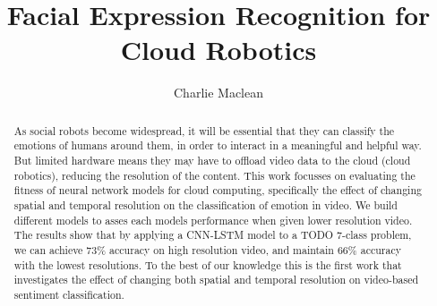 \documentclass[sigconf]{acmart}
\begin{document}
\title{Facial Expression Recognition for Cloud Robotics}

\author{Charlie Maclean}


\renewcommand{\shortauthors}{Charlie Maclean}

\begin{abstract}

As social robots become widespread, it will be essential that they can
classify the emotions of humans around them, in order to interact in a
meaningful and helpful way. But limited hardware means they
may have to offload video data to the cloud (cloud robotics), reducing the resolution of the
content. This work focusses on evaluating the fitness of neural network models
for cloud computing, specifically the effect of changing spatial and temporal 
resolution on the
classification of emotion in video. We build different models to asses each
models performance when given lower resolution video. The results show that by
applying a CNN-LSTM model to a TODO 7-class problem, we can achieve 73\% accuracy on high resolution
video, and maintain 66\% accuracy with the lowest resolutions. To the best of
our knowledge this is the first work that investigates the effect of changing
both spatial and temporal resolution on video-based sentiment classification.

\end{abstract}



\maketitle
\end{document}
